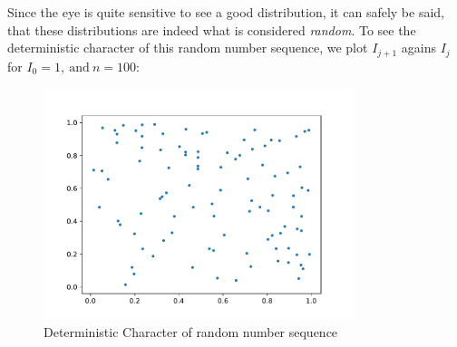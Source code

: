\documentclass{article}
\begin{document}
Since the eye is quite sensitive to see a good distribution, it can safely be
said, that these distributions are indeed what is considered \textit{random}.
To see the deterministic character of this random number sequence, we plot
\( I _{j + 1} \) agains \( I _{j} \) for \( I_0 = 1, \ \text{and} \ n = 100 \):
\begin{figure}[H]
    \centering
    \includegraphics[width=9cm]{Fig1-3.pdf}
    \caption{Deterministic Character of random number sequence}
\end{figure}

\end{document}
